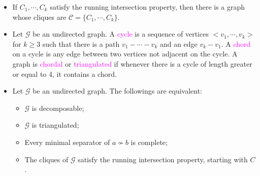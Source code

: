 \documentclass[UTF8]{book}
\newcommand{\concept}[1]{\textcolor{magenta}{#1}}
\begin{document}
\begin{itemize}
$$$$
\item If $C_1,\cdots,C_k$ satisfy the running intersection property, then there is a graph whose cliques are $\mathcal{C}=\{C_1,\cdots,C_k\}$.
\item Let $\mathcal{G}$ be an undirected graph. A \concept{cycle} is a sequence of vertices $<v_1,\cdots,v_k>$ for $k\geq 3$ such that there is a path $v_1 - \cdots - v_k$ and an edge $v_k - v_1$. A \concept{chord} on a cycle is any edge between two vertices not adjacent on the cycle. A graph is \concept{chordal} or \concept{triangulated} if whenever there is a cycle of length greater or equal to 4, it contains a chord.
\item Let $\mathcal{G}$ be an undirected graph. The followings are equivalent:
\begin{itemize}
	\item $\mathcal{G}$ is decomposable;
	\item $\mathcal{G}$ is triangulated;
	\item Every minimal separator of $a\not\sim b$ is complete;
	\item The cliques of $\mathcal{G}$ satisfy the running intersection property, starting with $C$.
\end{itemize}
\end{itemize}
\end{document}
